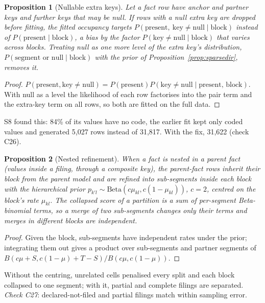 \documentclass[11pt,a4paper]{article}
\newtheorem{proposition}{Proposition}
\theoremstyle{definition}
\theoremstyle{remark}
\begin{document}
\begin{proposition}[Nullable extra keys]\label{prop:nullfk}
Let a fact row have anchor and partner keys and further keys that may be null. If rows with a null extra key are dropped before fitting, the fitted occupancy targets $P(\text{present},\ \text{key}\ne\text{null}\mid\text{block})$ instead of $P(\text{present}\mid\text{block})$, a bias by the factor $P(\text{key}\ne\text{null}\mid\text{block})$ that varies across blocks. Treating null as one more level of the extra key's distribution, $P(\text{segment or null}\mid\text{block})$ with the prior of Proposition~\ref{prop:sparsedir}, removes it.
\end{proposition}
\begin{proof}
$P(\text{present},\text{key}\ne\text{null})=P(\text{present})P(\text{key}\ne\text{null}\mid\text{present, block})$. With null as a level the likelihood of each row factorises into the pair term and the extra-key term on all rows, so both are fitted on the full data.
\end{proof}
\noindent S8 found this: 84\% of its values have no code, the earlier fit kept only coded values and generated 5{,}027 rows instead of 31{,}817. With the fix, 31{,}622 (check C26).

\begin{proposition}[Nested refinement]\label{prop:nested}
When a fact is nested in a parent fact (values inside a filing, through a composite key), the parent-fact rows inherit their block from the parent model and are refined into sub-segments inside each block with the hierarchical prior $p_{k'l}\sim\mathrm{Beta}(c\mu_{kl},c(1-\mu_{kl}))$, $c=2$, centred on the block's rate $\mu_{kl}$. The collapsed score of a partition is a sum of per-segment Beta-binomial terms, so a merge of two sub-segments changes only their terms and merges in different blocks are independent.
\end{proposition}
\begin{proof}
Given the block, sub-segments have independent rates under the prior; integrating them out gives a product over sub-segments and partner segments of $B(c\mu+S,c(1-\mu)+T-S)/B(c\mu,c(1-\mu))$.
\end{proof}
\noindent Without the centring, unrelated cells penalised every split and each block collapsed to one segment; with it, partial and complete filings are separated. \emph{Check C27}: declared-not-filed and partial filings match within sampling error.
\end{document}
